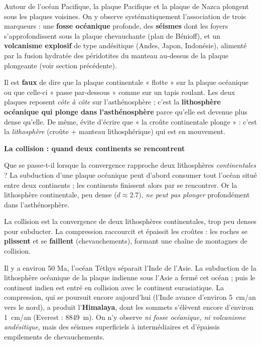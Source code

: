 \documentclass[11pt]{article}
\newcommand{\cle}[1]{{\popxbold\color{popdark}#1}}
\begin{document}
\begin{exemplebox}
Autour de l'océan Pacifique, la plaque Pacifique et la plaque de Nazca plongent sous les plaques voisines. On y observe systématiquement l'association de trois marqueurs : une \textbf{fosse océanique} profonde, des \textbf{séismes} dont les foyers s'approfondissent sous la plaque chevauchante (plan de Bénioff), et un \textbf{volcanisme explosif} de type andésitique (Andes, Japon, Indonésie), alimenté par la fusion hydratée des péridotites du manteau au-dessus de la plaque plongeante (voir section précédente).
\end{exemplebox}

\begin{attention}
Il est \textbf{faux} de dire que la plaque continentale « flotte » sur la plaque océanique ou que celle-ci « passe par-dessous » comme sur un tapis roulant. Les deux plaques reposent \emph{côte à côte} sur l'asthénosphère ; c'est la \textbf{lithosphère océanique qui plonge dans l'asthénosphère} parce qu'elle est devenue plus dense qu'elle. De même, évite d'écrire que « la croûte continentale plonge » : c'est la \emph{lithosphère} (croûte + manteau lithosphérique) qui est en mouvement.
\end{attention}

\textbf{La collision : quand deux continents se rencontrent}

Que se passe-t-il lorsque la convergence rapproche deux lithosphères \emph{continentales} ? La subduction d'une plaque océanique peut d'abord consumer tout l'océan situé entre deux continents ; les continents finissent alors par se rencontrer. Or la lithosphère continentale, peu dense ($d \approx \num{2,7}$), \emph{ne peut pas plonger} profondément dans l'asthénosphère.

\begin{definition}[Collision]
La \cle{collision} est la convergence de deux lithosphères continentales, trop peu denses pour subducter. La compression raccourcit et épaissit les croûtes : les roches se \textbf{plissent} et se \textbf{faillent} (chevauchements), formant une \cle{chaîne de montagnes} de collision.
\end{definition}

\begin{exemplebox}
Il y a environ 50 Ma, l'océan Téthys séparait l'Inde de l'Asie. La subduction de la lithosphère océanique de la plaque indienne sous l'Asie a fermé cet océan ; puis le continent indien est entré en collision avec le continent eurasiatique. La compression, qui se poursuit encore aujourd'hui (l'Inde avance d'environ \SI{5}{cm/an} vers le nord), a produit l'\textbf{Himalaya}, dont les sommets s'élèvent encore d'environ \SI{1}{cm/an} (Everest : \SI{8849}{m}). On n'y observe \emph{ni fosse océanique, ni volcanisme andésitique}, mais des séismes superficiels à intermédiaires et d'épaissis empilements de chevauchements.
\end{exemplebox}
\end{document}
